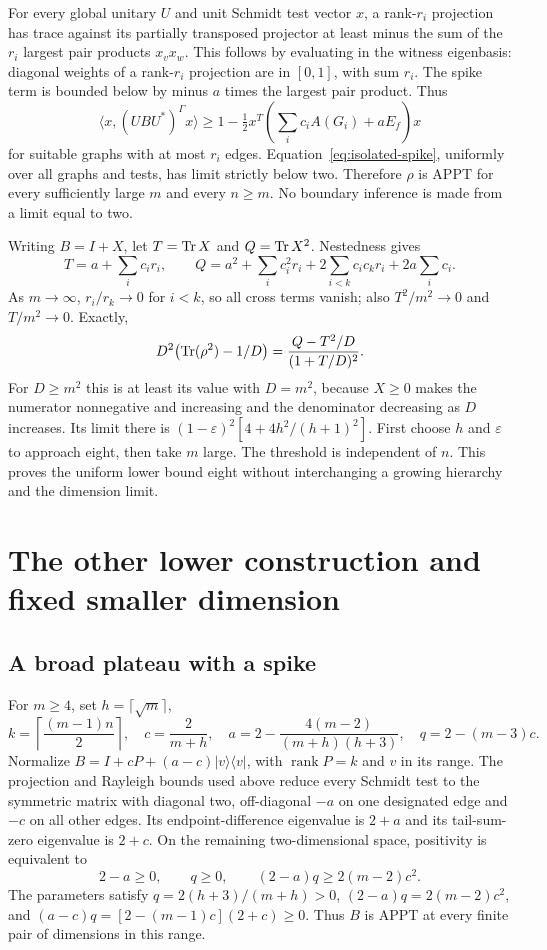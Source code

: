 For every global unitary $U$ and unit Schmidt test vector $x$, a
rank-$r_i$ projection has trace against its partially transposed
projector at least minus the sum of the $r_i$ largest pair products
$x_vx_w$. This follows by evaluating in the witness eigenbasis:
diagonal weights of a rank-$r_i$ projection are in $[0,1]$, with
sum $r_i$. The spike term is bounded below by minus $a$ times the
largest pair product. Thus
\[
 \langle x,(UBU^*)^\Gamma x\rangle
 \geq1-\tfrac12x^T\left(\sum_i c_iA(G_i)+aE_f\right)x
\]
for suitable graphs with at most $r_i$ edges.
Equation~\eqref{eq:isolated-spike}, uniformly over all graphs and
tests, has limit strictly below two. Therefore $\rho$ is APPT for
every sufficiently large $m$ and every $n\geq m$.
No boundary inference is made from a limit equal to two.

Writing $B=I+X$, let $T=\operatorname{Tr} X$ and $Q=\operatorname{Tr} X^2$. Nestedness gives
\[
 T=a+\sum_i c_ir_i,\qquad
 Q=a^2+\sum_i c_i^2r_i+2\sum_{i<k}c_ic_kr_i+2a\sum_i c_i.
\]
As $m\to\infty$, $r_i/r_k\to0$ for $i<k$, so all cross terms vanish;
also $T^2/m^2\to0$ and $T/m^2\to0$. Exactly,
\[
 D^2\bigl(\operatorname{Tr}(\rho^2)-1/D\bigr)
 =\frac{Q-T^2/D}{(1+T/D)^2}.
\]
For $D\geq m^2$ this is at least its value with $D=m^2$,
because $X\geq0$ makes the numerator nonnegative and increasing
and the denominator decreasing as $D$ increases. Its limit there is
$(1-\varepsilon)^2[4+4h^2/(h+1)^2]$.
First choose $h$ and $\varepsilon$ to approach eight, then take $m$
large. The threshold is independent of $n$. This proves the uniform
lower bound eight without interchanging a growing hierarchy and the
dimension limit.

\section{The other lower construction and fixed smaller dimension}\label{app:uniform-lower}
\subsection{A broad plateau with a spike}
For $m\geq4$, set $h=\lceil\sqrt m\rceil$,
\[
 k=\left\lceil\frac{(m-1)n}{2}\right\rceil,\quad
 c=\frac2{m+h},\quad
 a=2-\frac{4(m-2)}{(m+h)(h+3)},\quad q=2-(m-3)c.
\]
Normalize $B=I+cP+(a-c)|v\rangle\langle v|$, with
$\operatorname{rank}P=k$ and $v$ in its range.
The projection and Rayleigh bounds used above reduce every
Schmidt test to the symmetric matrix with diagonal two, off-diagonal
$-a$ on one designated edge and $-c$ on all other edges.
Its endpoint-difference eigenvalue is $2+a$ and its tail-sum-zero
eigenvalue is $2+c$. On the remaining two-dimensional space, positivity
is equivalent to
\[
 2-a\geq0,\qquad q\geq0,\qquad (2-a)q\geq2(m-2)c^2.
\]
The parameters satisfy $q=2(h+3)/(m+h)>0$,
$(2-a)q=2(m-2)c^2$, and
$(a-c)q=[2-(m-1)c](2+c)\geq0$.
Thus $B$ is APPT at every finite pair of dimensions in this range.

